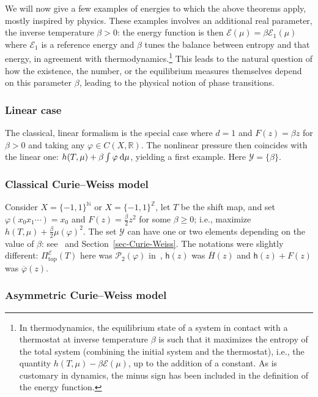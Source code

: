 \documentclass[AHL, Unicode, longabstracts,published]{cedram}
\theoremstyle{plain}
\theoremstyle{plain}
\newcommand\NLP{\Pi}
\renewcommand\top{{\mathrm{top}}}
\newcommand*{\dd} {\relax\ifnum\lastnodetype>0\mskip\medmuskip\fi\mathrm{d}}
\newcommand{\hf}{\mathsf{h}}
\newcommand{\pot}{\varphi}
\newcounter{In}
\newcommand*\8{\infty}
\newcommand{\ol}{\overline}
\newcommand\NN{\mathbb{N}}
\newcommand\RR{\mathbb{R}}
\newcommand\ZZ{\mathbb{Z}}
\newcommand{\En}{\mathcal{E}}
\newcommand{\CP}{\mathcal{P}}
\newcommand{\scY}{\mathscr{Y}}
\begin{document}
We will now give a few examples of energies to which the above theorems apply, mostly inspired by physics. These examples involves an additional real parameter, the inverse temperature $\beta>0$: the energy function is then $\En(\mu)=\beta\En_1(\mu)$ where $\En_1$ is a reference energy and $\beta$ tunes the balance between entropy and that energy, in agreement with thermodynamics.\footnote{In thermodynamics, the equilibrium state of a system in contact with a thermostat at inverse temperature $\beta$ is such that it maximizes the entropy of the total system (combining the initial system and the thermostat), i.e., the quantity $h(T,\mu)-\beta\En(\mu)$, up to the addition of a constant. As is customary in dynamics, the minus sign has been included in the definition of the energy function.} This leads to the natural question of how the existence, the number, or the equilibrium measures themselves depend on this parameter $\beta$, leading to the physical notion of phase transitions.


\subsubsection{Linear case}

The classical, linear formalism is the special case where $d=1$ and $F(z)= \beta z$ for $\beta>0$ and taking any $\pot\in C(X,\RR)$. The nonlinear pressure then coincides with the linear one: $h(T,\mu)+\beta\int \pot \dd\mu$, yielding a first example. Here $\scY=\{\beta\}$.



\subsubsection{Classical Curie--Weiss model}

Consider $X=\{-1,1\}^{\NN}$ or $X=\{-1,1\}^{\ZZ}$, let $T$ be the shift map, and set $\pot(x_0x_1\cdots)=x_0$ and $F(z)=\frac\beta2z^2$ for some $\beta\ge 0$; i.e., maximize $h(T,\mu)+\frac\beta2\mu(\pot)^2$. The set $\scY$ can have one or two elements depending on the value of $\beta$: see~\cite{Leplaideur-Watbled} and Section~\ref{sec-Curie-Weiss}. { The notations were slightly different: $\NLP^\En_\top(T)$ here was $\CP_{2}(\pot)$ in~\cite{Leplaideur-Watbled}, $\hf(z)$ was $\ol{H}(z)$ and $\hf(z)+F(z)$ was $\ol\varphi(z)$.}


\subsubsection{Asymmetric Curie--Weiss model}
\end{document}
